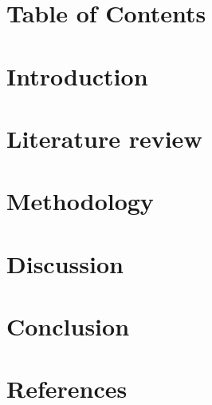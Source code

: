 \documentclass[12pt, a4paper]{article}
\begin{document}


\newpage
{}
\setcounter{page}{2}

 \newpage
 \newpage


\newpage
\renewcommand\contentsname{}
\section*{Table of Contents}
\tableofcontents

\newpage
\listoffigures
\listoftables

\newpage
\setcounter{page}{1}
\section{Introduction}


\newpage \section{Literature review}


\newpage \section{Methodology}


\newpage \section{Discussion}


\newpage \section{Conclusion}


\newpage
\section*{References}

\renewcommand{\refname}{}

\end{document}
